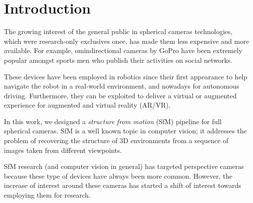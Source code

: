 \chapter{Introduction}
The growing interest of the general public in spherical cameras technologies, which were 
research-only exclusives once, has made them less expensive and more available. For example, omindirectional cameras by GoPro have been extremely popular amongst sports men who publish their activities on social networks.

These devices have been employed in robotics since their first appearance to help navigate the robot in a real-world environment, and nowadays for autonomous driving. Furthermore, they can be exploited to deliver a virtual or augmented experience for augmented and virtual reality (AR/VR).

In this work, we designed a \textit{structure from motion} (SfM) pipeline for 
full spherical cameras. SfM is a well known topic in computer vision; it addresses the problem of 
recovering the structure of 3D environments from a sequence of images taken from different viewpoints.

SfM research (and computer vision in general) has targeted perspective cameras because these type of devices have always been more common. However, the increase of interest around these cameras has started a shift of interest towards employing them for research.

